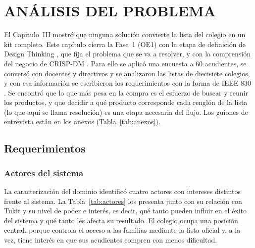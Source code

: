 \setcounter{subsection}{0}
\section{ANÁLISIS DEL PROBLEMA}

El Capítulo~III mostró que ninguna solución convierte la lista del colegio en un kit completo. Este
capítulo cierra la Fase~1 (OE1) con la etapa de definición de Design Thinking \citep{brown_design_2008},
que fija el problema que se va a resolver, y con la comprensión del negocio de CRISP-DM
\citep{chapman_crisp-dm_2000}. Para ello se aplicó una encuesta a 60 acudientes, se conversó con
docentes y directivos y se analizaron las listas de diecisiete colegios, y con esa información se
escribieron los requerimientos con la forma de IEEE 830 \citep{ieee_830_1998}. Se encontró que lo que más pesa en la compra es el esfuerzo de
buscar y reunir los productos, y que decidir a qué producto corresponde cada renglón de la lista (lo
que aquí se llama resolución) es una etapa necesaria del flujo. Los guiones de entrevista están en los
anexos (Tabla~\ref{tab:anexos}).\par

\subsection{Requerimientos}

\subsubsection{Actores del sistema}

La caracterización del dominio identificó cuatro actores con intereses distintos frente al
sistema. La Tabla~\ref{tab:actores} los presenta junto con su relación con Tukit y su nivel
de poder e interés, es decir, qué tanto pueden influir en el éxito del sistema y qué tanto
les afecta su resultado. El colegio ocupa una posición central, porque controla el
acceso a las familias mediante la lista oficial y, a la vez, tiene interés en que sus
acudientes compren con menos dificultad.\par

